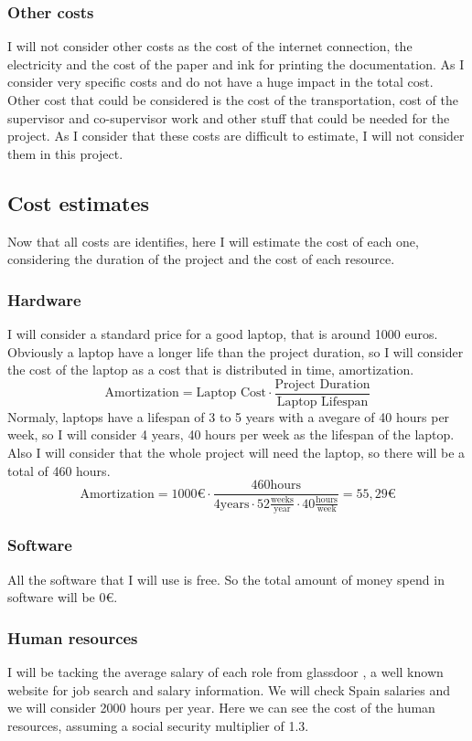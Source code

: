 \subsubsection*{Other costs}
I will not consider other costs as the cost of the internet connection, the electricity and the cost of the paper and ink for printing the documentation.
As I consider very specific costs and do not have a huge impact in the total cost.
Other cost that could be considered is the cost of the transportation, cost of the supervisor and co-supervisor work and other stuff that could be needed for the project.
As I consider that these costs are difficult to estimate, I will not consider them in this project.
\subsection{Cost estimates}
Now that all costs are identifies, here I will estimate the cost of each one, considering the duration of the project and the cost of each resource.
\subsubsection*{Hardware}
I will consider a standard price for a good laptop, that is around 1000 euros.
Obviously a laptop have a longer life than the project duration, so I will consider the cost of the laptop as a cost that is distributed in time, amortization.
$$
\text{Amortization} = \text{Laptop Cost} \cdot \frac{\text{Project Duration}}{\text{Laptop Lifespan}}
$$ 
Normaly, laptops have a lifespan of 3 to 5 years with a avegare of 40 hours per week, so I will consider 4 years, 40 hours per week as the lifespan of the laptop.
Also I will consider that the whole project will need the laptop, so there will be a total of 460 hours. 
$$
\text{Amortization} = 1000 \text{€} \cdot \frac{460 \text{hours}}{4 \text{years} \cdot 52 \frac{\text{weeks}}{\text{year}} \cdot 40 \frac{\text{hours}}{\text{week}}} = 55,29 \text{€}
$$
\subsubsection*{Software}
All the software that I will use is free. So the total amount of money spend in software will be 0€.
\subsubsection*{Human resources}
I will be tacking the average salary of each role from glassdoor \cite{noauthor_salary_2024} \cite{noauthor_salary_2024-1}\cite{noauthor_salary_2024-2}, a well known website for job search and salary information.
We will check Spain salaries and we will consider 2000 hours per year.
Here we can see the cost of the human resources, assuming a social security multiplier of 1.3.

